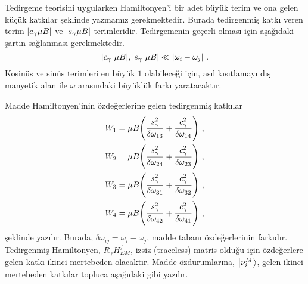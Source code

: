 Tedirgeme teorisini uygularken Hamiltonyen'i bir adet büyük terim ve ona gelen küçük katkılar şeklinde yazmamız gerekmektedir. Burada tedirgenmiş katkı veren terim $ \abs{c_{\gamma}\mu B} $ ve $ \abs{s_{\gamma}\mu B} $ terimleridir. Tedirgemenin geçerli olması için aşağıdaki şartın sağlanması gerekmektedir.
\begin{equation}
	\abs{c_{\gamma}~\mu B},\abs{s_{\gamma}~\mu B}   \ll \abs{\omega_{i}-\omega_{j}}\text{ .}
\end{equation}
Kosinüs ve sinüs terimleri en büyük $ 1 $ olabileceği için, asıl kısıtlamayı dış manyetik alan ile $ \omega $ arasındaki büyüklük farkı yaratacaktır. 

Madde Hamiltonyen'inin özdeğerlerine gelen tedirgenmiş katkılar
\begin{align}
	W_{1} = \mu B \qty(\frac{s^{2}_{\gamma}}{\delta \omega_{13}} + \frac{c^{2}_{\gamma}}{\delta \omega_{14}}) \text{ ,}\\
	W_{2} = \mu B \qty(\frac{s^{2}_{\gamma}}{\delta \omega_{24}} + \frac{c^{2}_{\gamma}}{\delta \omega_{23}}) \text{ ,}\\
	W_{3} = \mu B \qty(\frac{s^{2}_{\gamma}}{\delta \omega_{31}} + \frac{c^{2}_{\gamma}}{\delta \omega_{32}}) \text{ ,}\\
	W_{4} = \mu B \qty(\frac{s^{2}_{\gamma}}{\delta \omega_{42}} + \frac{c^{2}_{\gamma}}{\delta \omega_{41}}) \text{ ,}
\end{align}
şeklinde yazılır. Burada, $ \delta \omega_{ij} = \omega_{i} - \omega_{j} $, madde tabanı özdeğerlerinin farkıdır. Tedirgenmiş Hamiltonyen, $ R_{\gamma}H^{f}_{EM} $, izsiz (traceless) matris olduğu için özdeğerlere gelen katkı ikinci mertebeden olacaktır. Madde özdurumlarına, $ \ket{\nu^{M}_{i}} $, gelen ikinci mertebeden katkılar topluca aşağıdaki gibi yazılır.
